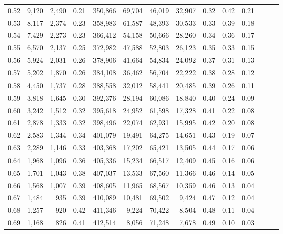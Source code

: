 \begin{tabular}{rrrrrrrrrrrrrr}
0.52 &   9,120 &  2,490 &  0.21 &  350,866 &   69,704 &  46,019 &  32,907 &  0.32 &  0.42 &      0.21 \\
0.53 &   8,117 &  2,374 &  0.23 &  358,983 &   61,587 &  48,393 &  30,533 &  0.33 &  0.39 &      0.18 \\
0.54 &   7,429 &  2,273 &  0.23 &  366,412 &   54,158 &  50,666 &  28,260 &  0.34 &  0.36 &      0.17 \\
0.55 &   6,570 &  2,137 &  0.25 &  372,982 &   47,588 &  52,803 &  26,123 &  0.35 &  0.33 &      0.15 \\
0.56 &   5,924 &  2,031 &  0.26 &  378,906 &   41,664 &  54,834 &  24,092 &  0.37 &  0.31 &      0.13 \\
0.57 &   5,202 &  1,870 &  0.26 &  384,108 &   36,462 &  56,704 &  22,222 &  0.38 &  0.28 &      0.12 \\
0.58 &   4,450 &  1,737 &  0.28 &  388,558 &   32,012 &  58,441 &  20,485 &  0.39 &  0.26 &      0.11 \\
0.59 &   3,818 &  1,645 &  0.30 &  392,376 &   28,194 &  60,086 &  18,840 &  0.40 &  0.24 &      0.09 \\
0.60 &   3,242 &  1,512 &  0.32 &  395,618 &   24,952 &  61,598 &  17,328 &  0.41 &  0.22 &      0.08 \\
0.61 &   2,878 &  1,333 &  0.32 &  398,496 &   22,074 &  62,931 &  15,995 &  0.42 &  0.20 &      0.08 \\
0.62 &   2,583 &  1,344 &  0.34 &  401,079 &   19,491 &  64,275 &  14,651 &  0.43 &  0.19 &      0.07 \\
0.63 &   2,289 &  1,146 &  0.33 &  403,368 &   17,202 &  65,421 &  13,505 &  0.44 &  0.17 &      0.06 \\
0.64 &   1,968 &  1,096 &  0.36 &  405,336 &   15,234 &  66,517 &  12,409 &  0.45 &  0.16 &      0.06 \\
0.65 &   1,701 &  1,043 &  0.38 &  407,037 &   13,533 &  67,560 &  11,366 &  0.46 &  0.14 &      0.05 \\
0.66 &   1,568 &  1,007 &  0.39 &  408,605 &   11,965 &  68,567 &  10,359 &  0.46 &  0.13 &      0.04 \\
0.67 &   1,484 &    935 &  0.39 &  410,089 &   10,481 &  69,502 &   9,424 &  0.47 &  0.12 &      0.04 \\
0.68 &   1,257 &    920 &  0.42 &  411,346 &    9,224 &  70,422 &   8,504 &  0.48 &  0.11 &      0.04 \\
0.69 &   1,168 &    826 &  0.41 &  412,514 &    8,056 &  71,248 &   7,678 &  0.49 &  0.10 &      0.03 \\

\end{tabular}
